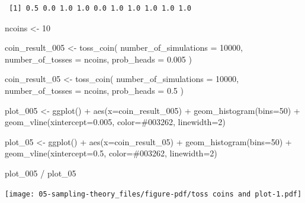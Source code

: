 \documentclass[
  letterpaper,
  DIV=11,
  numbers=noendperiod]{scrreprt}
\newenvironment{Shaded}{\begin{snugshade}}{\end{snugshade}}
\newcommand{\AttributeTok}[1]{\textcolor[rgb]{0.40,0.45,0.13}{#1}}
\newcommand{\DecValTok}[1]{\textcolor[rgb]{0.68,0.00,0.00}{#1}}
\newcommand{\FloatTok}[1]{\textcolor[rgb]{0.68,0.00,0.00}{#1}}
\newcommand{\FunctionTok}[1]{\textcolor[rgb]{0.28,0.35,0.67}{#1}}
\newcommand{\NormalTok}[1]{\textcolor[rgb]{0.00,0.23,0.31}{#1}}
\newcommand{\OtherTok}[1]{\textcolor[rgb]{0.00,0.23,0.31}{#1}}
\newcommand{\SpecialCharTok}[1]{\textcolor[rgb]{0.37,0.37,0.37}{#1}}
\newcommand{\StringTok}[1]{\textcolor[rgb]{0.13,0.47,0.30}{#1}}
\begin{document}
\begin{verbatim}
 [1] 0.5 0.0 1.0 1.0 0.0 1.0 1.0 1.0 1.0 1.0
\end{verbatim}

\begin{Shaded}
\begin{Highlighting}[]
\NormalTok{ncoins }\OtherTok{\textless{}{-}} \DecValTok{10}

\NormalTok{coin\_result\_005 }\OtherTok{\textless{}{-}} \FunctionTok{toss\_coin}\NormalTok{(}
  \AttributeTok{number\_of\_simulations =} \DecValTok{10000}\NormalTok{,}
  \AttributeTok{number\_of\_tosses =}\NormalTok{ ncoins, }
  \AttributeTok{prob\_heads =} \FloatTok{0.005}
\NormalTok{  )}

\NormalTok{coin\_result\_05 }\OtherTok{\textless{}{-}} \FunctionTok{toss\_coin}\NormalTok{(}
  \AttributeTok{number\_of\_simulations =} \DecValTok{10000}\NormalTok{,}
  \AttributeTok{number\_of\_tosses =}\NormalTok{ ncoins, }
  \AttributeTok{prob\_heads =} \FloatTok{0.5}
\NormalTok{  )}

\NormalTok{plot\_005 }\OtherTok{\textless{}{-}} \FunctionTok{ggplot}\NormalTok{() }\SpecialCharTok{+} 
    \FunctionTok{aes}\NormalTok{(}\AttributeTok{x=}\NormalTok{coin\_result\_005) }\SpecialCharTok{+} 
    \FunctionTok{geom\_histogram}\NormalTok{(}\AttributeTok{bins=}\DecValTok{50}\NormalTok{) }\SpecialCharTok{+} 
    \FunctionTok{geom\_vline}\NormalTok{(}\AttributeTok{xintercept=}\FloatTok{0.005}\NormalTok{, }\AttributeTok{color=}\StringTok{\textquotesingle{}\#003262\textquotesingle{}}\NormalTok{, }\AttributeTok{linewidth=}\DecValTok{2}\NormalTok{)}

\NormalTok{plot\_05 }\OtherTok{\textless{}{-}} \FunctionTok{ggplot}\NormalTok{() }\SpecialCharTok{+} 
    \FunctionTok{aes}\NormalTok{(}\AttributeTok{x=}\NormalTok{coin\_result\_05) }\SpecialCharTok{+} 
    \FunctionTok{geom\_histogram}\NormalTok{(}\AttributeTok{bins=}\DecValTok{50}\NormalTok{) }\SpecialCharTok{+} 
    \FunctionTok{geom\_vline}\NormalTok{(}\AttributeTok{xintercept=}\FloatTok{0.5}\NormalTok{, }\AttributeTok{color=}\StringTok{\textquotesingle{}\#003262\textquotesingle{}}\NormalTok{, }\AttributeTok{linewidth=}\DecValTok{2}\NormalTok{)}

\NormalTok{plot\_005 }\SpecialCharTok{/} 
\NormalTok{  plot\_05}
\end{Highlighting}
\end{Shaded}

\texttt{[image: 05-sampling-theory\_files/figure-pdf/toss coins and plot-1.pdf]}
\end{document}

